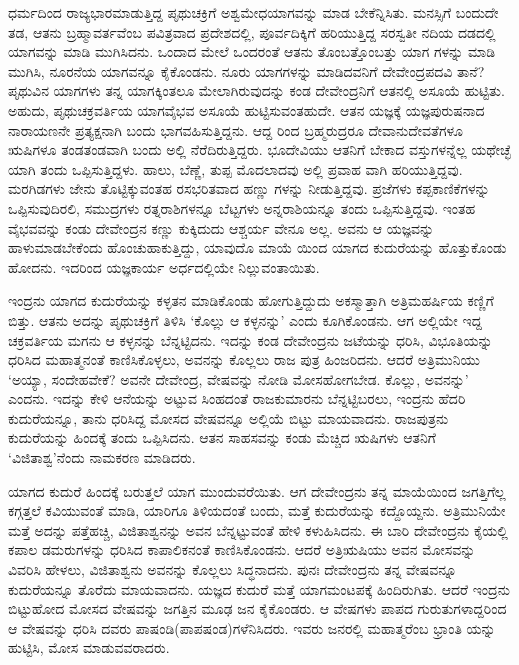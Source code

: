 ಧರ್ಮದಿಂದ ರಾಜ್ಯಭಾರಮಾಡುತ್ತಿದ್ದ ಪೃಥುಚಕ್ರಿಗೆ ಅಶ್ವಮೇಧಯಾಗವನ್ನು ಮಾಡ ಬೇಕೆನ್ನಿಸಿತು. ಮನಸ್ಸಿಗೆ ಬಂದುದೇ ತಡ, ಆತನು ಬ್ರಹ್ಮಾವರ್ತವೆಂಬ ಪವಿತ್ರವಾದ ಪ್ರದೇಶದಲ್ಲಿ, ಪೂರ್ವದಿಕ್ಕಿಗೆ ಹರಿಯುತ್ತಿದ್ದ ಸರಸ್ವತೀ ನದಿಯ ದಡದಲ್ಲಿ ಯಾಗವನ್ನು ಮಾಡಿ ಮುಗಿಸಿದನು. ಒಂದಾದ ಮೇಲೆ ಒಂದರಂತೆ ಆತನು ತೊಂಬತ್ತೊಂಬತ್ತು ಯಾಗ ಗಳನ್ನು ಮಾಡಿ ಮುಗಿಸಿ, ನೂರನೆಯ ಯಾಗವನ್ನೂ ಕೈಕೊಂಡನು. ನೂರು ಯಾಗಗಳನ್ನು ಮಾಡಿದವನಿಗೆ ದೇವೇಂದ್ರಪದವಿ ತಾನೆ? ಪೃಥುವಿನ ಯಾಗಗಳು ತನ್ನ ಯಾಗಕ್ಕಿಂತಲೂ ಮೇಲಾಗಿರುವುದನ್ನು ಕಂಡ ದೇವೇಂದ್ರನಿಗೆ ಆತನಲ್ಲಿ ಅಸೂಯೆ ಹುಟ್ಟಿತು. ಅಹುದು, ಪೃಥುಚಕ್ರವರ್ತಿಯ ಯಾಗವೈಭವ ಅಸೂಯೆ ಹುಟ್ಟಿಸುವಂತಹುದೇ. ಆತನ ಯಜ್ಞಕ್ಕೆ ಯಜ್ಞಪುರುಷನಾದ ನಾರಾಯಣನೇ ಪ್ರತ್ಯಕ್ಷನಾಗಿ ಬಂದು ಭಾಗವಹಿಸುತ್ತಿದ್ದನು. ಆದ್ದ ರಿಂದ ಬ್ರಹ್ಮರುದ್ರರೂ ದೇವಾನುದೇವತೆಗಳೂ ಋಷಿಗಳೂ ತಂಡತಂಡವಾಗಿ ಬಂದು ಅಲ್ಲಿ ನೆರೆದಿರುತ್ತಿದ್ದರು. ಭೂದೇವಿಯು ಆತನಿಗೆ ಬೇಕಾದ ವಸ್ತುಗಳನ್ನೆಲ್ಲ ಯಥೇಚ್ಛೆ ಯಾಗಿ ತಂದು ಒಪ್ಪಿಸುತ್ತಿದ್ದಳು. ಹಾಲು, ಬೆಣ್ಣೆ, ತುಪ್ಪ ಮೊದಲಾದವು ಅಲ್ಲಿ ಪ್ರವಾಹ ವಾಗಿ ಹರಿಯುತ್ತಿದ್ದವು. ಮರಗಿಡಗಳು ಜೇನು ತೊಟ್ಟಿಕ್ಕುವಂತಹ ರಸಭರಿತವಾದ ಹಣ್ಣು ಗಳನ್ನು ನೀಡುತ್ತಿದ್ದವು. ಪ್ರಜೆಗಳು ಕಪ್ಪಕಾಣಿಕೆಗಳನ್ನು ಒಪ್ಪಿಸುವುದಿರಲಿ, ಸಮುದ್ರಗಳು ರತ್ನರಾಶಿಗಳನ್ನೂ ಬೆಟ್ಟಗಳು ಅನ್ನರಾಶಿಯನ್ನೂ ತಂದು ಒಪ್ಪಿಸುತ್ತಿದ್ದವು. ಇಂತಹ ವೈಭವವನ್ನು ಕಂಡು ದೇವೇಂದ್ರನ ಕಣ್ಣು ಕುಕ್ಕಿದುದು ಆಶ್ಚರ್ಯ ವೇನೂ ಅಲ್ಲ. ಅವನು ಆ ಯಜ್ಞವನ್ನು ಹಾಳುಮಾಡಬೇಕೆಂದು ಹೊಂಚುಹಾಕುತ್ತಿದ್ದು, ಯಾವುದೊ ಮಾಯೆ ಯಿಂದ ಯಾಗದ ಕುದುರೆಯನ್ನು ಹೊತ್ತುಕೊಂಡು ಹೋದನು. ಇದರಿಂದ ಯಜ್ಞಕಾರ್ಯ ಅರ್ಧದಲ್ಲಿಯೇ ನಿಲ್ಲುವಂತಾಯಿತು.

ಇಂದ್ರನು ಯಾಗದ ಕುದುರೆಯನ್ನು ಕಳ್ಳತನ ಮಾಡಿಕೊಂಡು ಹೋಗುತ್ತಿದ್ದುದು ಅಕಸ್ಮಾತ್ತಾಗಿ ಅತ್ರಿಮಹರ್ಷಿಯ ಕಣ್ಣಿಗೆ ಬಿತ್ತು. ಆತನು ಅದನ್ನು ಪೃಥುಚಕ್ರಿಗೆ ತಿಳಿಸಿ ‘ಕೊಲ್ಲು ಆ ಕಳ್ಳನನ್ನು’ ಎಂದು ಕೂಗಿಕೊಂಡನು. ಆಗ ಅಲ್ಲಿಯೇ ಇದ್ದ ಚಕ್ರವರ್ತಿಯ ಮಗನು ಆ ಕಳ್ಳನನ್ನು ಬೆನ್ನಟ್ಟಿದನು. ಇದನ್ನು ಕಂಡ ದೇವೇಂದ್ರನು ಜಟೆಯನ್ನು ಧರಿಸಿ, ವಿಭೂತಿಯನ್ನು ಧರಿಸಿದ ಮಹಾತ್ಮನಂತೆ ಕಾಣಿಸಿಕೊಳ್ಳಲು, ಅವನನ್ನು ಕೊಲ್ಲಲು ರಾಜ ಪುತ್ರ ಹಿಂಜರಿದನು. ಆದರೆ ಅತ್ರಿಮುನಿಯು ‘ಅಯ್ಯಾ, ಸಂದೇಹವೇಕೆ? ಅವನೇ ದೇವೇಂದ್ರ, ವೇಷವನ್ನು ನೋಡಿ ಮೋಸಹೋಗಬೇಡ. ಕೊಲ್ಲು, ಅವನನ್ನು’ ಎಂದನು. ಇದನ್ನು ಕೇಳಿ ಆನೆಯನ್ನು ಅಟ್ಟುವ ಸಿಂಹದಂತೆ ರಾಜಕುಮಾರನು ಬೆನ್ನಟ್ಟಿಬರಲು, ಇಂದ್ರನು ಹೆದರಿ ಕುದುರೆಯನ್ನೂ, ತಾನು ಧರಿಸಿದ್ದ ಮೋಸದ ವೇಷವನ್ನೂ ಅಲ್ಲಿಯೆ ಬಿಟ್ಟು ಮಾಯವಾದನು. ರಾಜಪುತ್ರನು ಕುದುರೆಯನ್ನು ಹಿಂದಕ್ಕೆ ತಂದು ಒಪ್ಪಿಸಿದನು. ಆತನ ಸಾಹಸವನ್ನು ಕಂಡು ಮೆಚ್ಚಿದ ಋಷಿಗಳು ಆತನಿಗೆ ‘ವಿಜಿತಾಶ್ವ’ನೆಂದು ನಾಮಕರಣ ಮಾಡಿದರು.

ಯಾಗದ ಕುದುರೆ ಹಿಂದಕ್ಕೆ ಬರುತ್ತಲೆ ಯಾಗ ಮುಂದುವರೆಯಿತು. ಆಗ ದೇವೇಂದ್ರನು ತನ್ನ ಮಾಯೆಯಿಂದ ಜಗತ್ತಿಗೆಲ್ಲ ಕಗ್ಗತ್ತಲೆ ಕವಿಯುವಂತೆ ಮಾಡಿ, ಯಾರಿಗೂ ತಿಳಿಯದಂತೆ ಬಂದು, ಮತ್ತೆ ಕುದುರೆಯನ್ನು ಕದ್ದೊಯ್ದನು. ಅತ್ರಿಮುನಿಯೇ ಮತ್ತೆ ಅದನ್ನು ಪತ್ತೆಹಚ್ಚಿ, ವಿಜಿತಾಶ್ವನನ್ನು ಅವನ ಬೆನ್ನಟ್ಟುವಂತೆ ಹೇಳಿ ಕಳುಹಿಸಿದನು. ಈ ಬಾರಿ ದೇವೇಂದ್ರನು ಕೈಯಲ್ಲಿ ಕಪಾಲ ಡಮರುಗಳನ್ನು ಧರಿಸಿದ ಕಾಪಾಲಿಕನಂತೆ ಕಾಣಿಸಿಕೊಂಡನು. ಆದರೆ ಅತ್ರಿಋಷಿಯು ಅವನ ಮೋಸವನ್ನು ವಿವರಿಸಿ ಹೇಳಲು, ವಿಜಿತಾಶ್ವನು ಅವನನ್ನು ಕೊಲ್ಲಲು ಸಿದ್ಧನಾದನು. ಪುನಃ ದೇವೇಂದ್ರನು ತನ್ನ ವೇಷವನ್ನೂ ಕುದುರೆಯನ್ನೂ ತೊರೆದು ಮಾಯವಾದನು. ಯಜ್ಞದ ಕುದುರೆ ಮತ್ತೆ ಯಾಗಮಂಟಪಕ್ಕೆ ಹಿಂದಿರುಗಿತು. ಆದರೆ ಇಂದ್ರನು ಬಿಟ್ಟುಹೋದ ಮೋಸದ ವೇಷವನ್ನು ಜಗತ್ತಿನ ಮೂಢ ಜನ ಕೈಕೊಂಡರು. ಆ ವೇಷಗಳು ಪಾಪದ ಗುರುತುಗಳಾದ್ದರಿಂದ ಆ ವೇಷವನ್ನು ಧರಿಸಿ ದವರು ಪಾಷಂಡಿ(ಪಾಪಷಂಡ)ಗಳೆನಿಸಿದರು. ಇವರು ಜನರಲ್ಲಿ ಮಹಾತ್ಮರೆಂಬ ಭ್ರಾಂತಿ ಯನ್ನು ಹುಟ್ಟಿಸಿ, ಮೋಸ ಮಾಡುವವರಾದರು.

